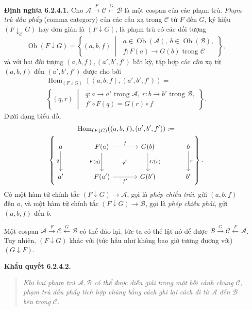 \noindent\textbf{Định nghĩa 6.2.4.1.} Cho $\mathcal A\xrightarrow F\mathcal C\xleftarrow G\mathcal B$ là một cospan của các phạm trù. \emph{Phạm trù dấu phẩy} (comma category) của các cấu xạ trong $\mathcal C$ từ $F$ đến $G$, ký hiệu $(F\downarrow_{\mathcal C}G)$ hay đơn giản là $(F\downarrow G)$, là phạm trù có các đối tượng
\[\operatorname{Ob}(F\downarrow G)=\left\{(a,b,f)\;\middle|\;\begin{gathered}a\in\operatorname{Ob}(\mathcal A),\ b\in\operatorname{Ob}(\mathcal B),\\f:F(a)\to G(b)\text{ trong }\mathcal C\end{gathered}\right\},\]
và với hai đối tượng $(a,b,f),(a',b',f')$ bất kỳ, tập hợp các cấu xạ từ $(a,b,f)$ đến $(a',b',f')$ được cho bởi
\[\begin{gathered}\operatorname{Hom}_{(F\downarrow G)}((a,b,f),(a',b',f'))=\\\left\{(q,r)\;\middle|\;\begin{gathered}q:a\to a'\text{ trong }\mathcal A,\ r:b\to b'\text{ trong }\mathcal B,\\ f'\circ F(q)=G(r)\circ f\end{gathered}\right\}.\end{gathered}\]
Dưới dạng biểu đồ,
\[\begin{gathered}\operatorname{Hom}_{(F\downarrow G)}((a,b,f),(a',b',f')):=\\
\left\{\begin{tikzcd}[ampersand replacement=\&,column sep=large,row sep=large]a\arrow[d,"q"']\&F(a)\arrow[r,"f"]\arrow[d,"F(q)"']\arrow[dr,phantom,"\checkmark"]\&G(b)\arrow[d,"G(r)"]\&b\arrow[d,"r"]\\a'\&F(a')\arrow[r,"f'"']\&G(b')\&b'\end{tikzcd}\right\}.
\end{gathered}\]
Có một hàm tử chính tắc $(F\downarrow G)\to\mathcal A$, gọi là \emph{phép chiếu trái}, gửi $(a,b,f)$ đến $a$, và một hàm tử chính tắc $(F\downarrow G)\to\mathcal B$, gọi là \emph{phép chiếu phải}, gửi $(a,b,f)$ đến $b$.

Một cospan $\mathcal A\xrightarrow F\mathcal C\xleftarrow G\mathcal B$ có thể đảo lại, tức ta có thể lật nó để được $\mathcal B\xrightarrow G\mathcal C\xleftarrow F\mathcal A$. Tuy nhiên, $(F\downarrow G)$ khác với (tức hầu như không bao giờ tương đương với) $(G\downarrow F)$.

\noindent\textbf{Khẩu quyết 6.2.4.2.}\keepwithnext
\begin{quote}\itshape Khi hai phạm trù $\mathcal A,\mathcal B$ có thể được diễn giải trong một bối cảnh chung $\mathcal C$, phạm trù dấu phẩy tích hợp chúng bằng cách ghi lại cách đi từ $\mathcal A$ đến $\mathcal B$ bên trong $\mathcal C$.\end{quote}

